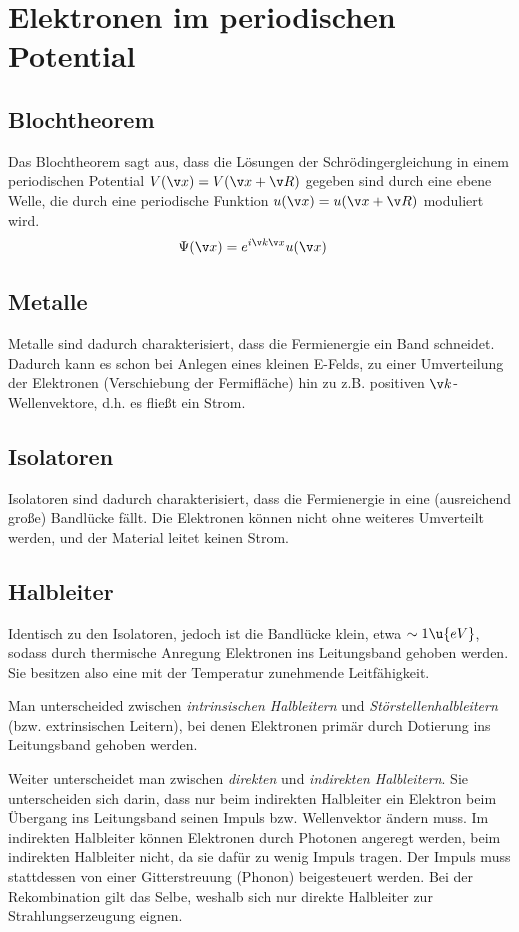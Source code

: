 \documentclass[bfvec]{summery_5.0}
\begin{document}
\section{Elektronen im periodischen Potential}

\subsection{Blochtheorem}
Das Blochtheorem sagt aus, dass die Lösungen der Schrödingergleichung in einem periodischen Potential $V(\v x) = V(\v x + \v R)$ gegeben sind durch eine ebene Welle, die durch eine periodische Funktion $u(\v x) = u(\v x + \v R)$ moduliert wird.  
\begin{align}
    \Psi(\v x) &= e^{i\v k \v x} u(\v x)
\end{align}

\subsection{Metalle}
Metalle sind dadurch charakterisiert, dass die Fermienergie ein Band schneidet. Dadurch kann es schon bei Anlegen eines kleinen E-Felds, zu einer Umverteilung der Elektronen (Verschiebung der Fermifläche) hin zu z.B. positiven $\v k$-Wellenvektore, d.h. es fließt ein Strom.

\subsection{Isolatoren }
Isolatoren sind dadurch charakterisiert, dass die Fermienergie in eine (ausreichend große) Bandlücke fällt. Die Elektronen können nicht ohne weiteres Umverteilt werden, und der Material leitet keinen Strom.

\subsection{Halbleiter}
Identisch zu den Isolatoren, jedoch ist die Bandlücke klein, etwa $\sim 1\u{eV}$, sodass durch thermische Anregung Elektronen ins Leitungsband gehoben werden. Sie besitzen also eine mit der Temperatur zunehmende Leitfähigkeit.

Man unterscheided zwischen \emph{intrinsischen Halbleitern} und \emph{Störstellenhalbleitern} (bzw. extrinsischen Leitern), bei denen Elektronen primär durch Dotierung ins Leitungsband gehoben werden.

Weiter unterscheidet man zwischen \emph{direkten} und \emph{indirekten Halbleitern}. Sie unterscheiden sich darin, dass nur beim indirekten Halbleiter ein Elektron beim Übergang ins Leitungsband seinen Impuls bzw. Wellenvektor ändern muss. Im indirekten Halbleiter können Elektronen durch Photonen angeregt werden, beim indirekten Halbleiter nicht, da sie dafür zu wenig Impuls tragen. Der Impuls muss stattdessen von einer Gitterstreuung (Phonon) beigesteuert werden. Bei der Rekombination gilt das Selbe, weshalb sich nur direkte Halbleiter zur Strahlungserzeugung eignen.
\end{document}
